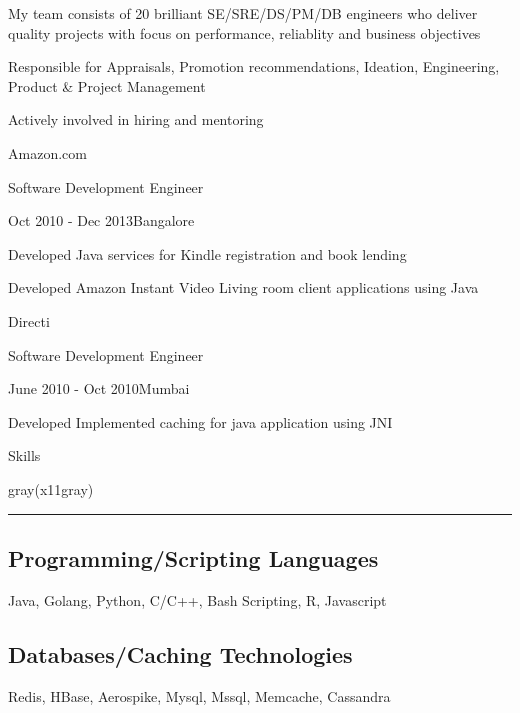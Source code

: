 \documentclass[8pt,a4paper]{article}
\begin{document}
\begin{multicols}{2}
\begin{desc}{My team consists of 20 brilliant SE/SRE/DS/PM/DB engineers who deliver quality projects with focus on performance, reliablity and business objectives}
\end{desc}
\begin{desc}{Responsible for Appraisals, Promotion recommendations, Ideation, Engineering, Product \& Project Management}
\end{desc}
\begin{desc}{Actively involved in hiring and mentoring}
\end{desc}
\begin{expsec}{Amazon.com}
\end{expsec}
\begin{expsubsec}{Software Development Engineer}
\end{expsubsec}
\begin{timeandlocation}Oct 2010 - Dec 2013{\textbar}Bangalore
\end{timeandlocation}
\begin{desc}{Developed Java services for Kindle registration and book lending}
\end{desc}
\begin{desc}{Developed Amazon Instant Video Living room client applications using Java}
\end{desc}
\begin{expsec}{Directi}
\end{expsec}
\begin{expsubsec}{Software Development Engineer}
\end{expsubsec}
\begin{timeandlocation}June 2010 - Oct 2010{\textbar}Mumbai
\end{timeandlocation}
\begin{desc}{Developed Implemented caching for java application using JNI}
\end{desc}
\vspace{4mm}
\begin{section}{Skills}
\end{section}
\begin{color}{gray(x11gray)}\hrule\end{color}
\vspace{5mm}
\subsection{Programming/Scripting Languages}
Java, Golang, Python, C/C++, Bash Scripting, R, Javascript
\subsection{Databases/Caching Technologies}
Redis, HBase, Aerospike, Mysql, Mssql, Memcache, Cassandra

\end{multicols}
\end{document}
